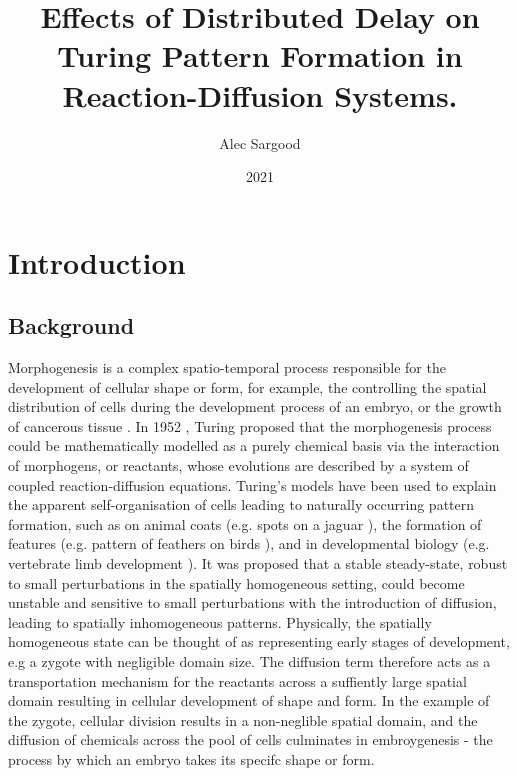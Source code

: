 \documentclass[12pt]{report}
\title{Effects of Distributed Delay on Turing Pattern Formation in Reaction-Diffusion Systems.}
\author{Alec Sargood}
\begin{document}
\date{2021}
\maketitle

\tableofcontents
\newpage
\chapter{Introduction}

\section{Background}

Morphogenesis is a complex spatio-temporal process responsible for the development of cellular shape or form, for example, the controlling the spatial distribution of cells during the development process of an embryo, or the growth of cancerous tissue \cite{morph}. In 1952 \cite{turing}, Turing proposed that the morphogenesis process could be mathematically modelled as a purely chemical basis via the interaction of morphogens, or reactants, whose evolutions are described by a system of coupled reaction-diffusion equations. Turing's models have been used to explain the apparent self-organisation of cells leading to naturally occurring pattern formation, such as on animal coats (e.g. spots on a jaguar \cite{painter}), the formation of features (e.g. pattern of feathers on birds \cite{bailleul}), and in developmental biology (e.g. vertebrate limb development \cite{miura1,glimm,miura2}). It was proposed that a stable steady-state, robust to small perturbations in the spatially homogeneous setting, could become unstable and sensitive to small perturbations with the introduction of diffusion, leading to spatially inhomogeneous patterns. Physically, the spatially homogeneous state can be thought of as representing early stages of development, e.g a zygote with negligible domain size. The diffusion term therefore acts as a transportation mechanism for the reactants across a suffiently large spatial domain resulting in cellular development of shape and form. In the example of the zygote, cellular division results in a non-neglible spatial domain, and the diffusion of chemicals across the pool of cells culminates in embroygenesis - the process by which an embryo takes its specifc shape or form.
\\
\end{document}
